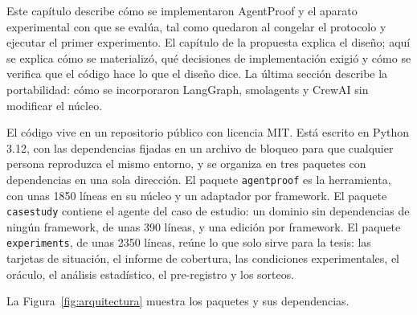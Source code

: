 \clearpage
\blank
{}
\begingroup\dobleesp
\vspace{6pt}
Este capítulo describe cómo se implementaron AgentProof y el aparato experimental con que se evalúa, tal como quedaron al congelar el protocolo y ejecutar el primer experimento. El capítulo de la propuesta explica el diseño; aquí se explica cómo se materializó, qué decisiones de implementación exigió y cómo se verifica que el código hace lo que el diseño dice. La última sección describe la portabilidad: cómo se incorporaron LangGraph, smolagents y CrewAI sin modificar el núcleo.
\par

El código vive en un repositorio público con licencia MIT. Está escrito en Python 3.12, con las dependencias fijadas en un archivo de bloqueo para que cualquier persona reproduzca el mismo entorno, y se organiza en tres paquetes con dependencias en una sola dirección. El paquete \texttt{agentproof} es la herramienta, con unas 1850 líneas en su núcleo y un adaptador por framework. El paquete \texttt{casestudy} contiene el agente del caso de estudio: un dominio sin dependencias de ningún framework, de unas 390 líneas, y una edición por framework. El paquete \texttt{experiments}, de unas 2350 líneas, reúne lo que solo sirve para la tesis: las tarjetas de situación, el informe de cobertura, las condiciones experimentales, el oráculo, el análisis estadístico, el pre-registro y los sorteos.
\par
La Figura~\ref{fig:arquitectura} muestra los paquetes y sus dependencias.
\par

